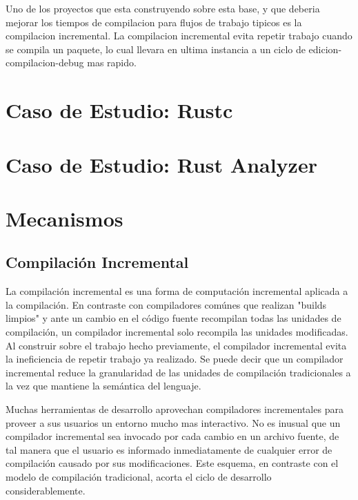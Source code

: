\documentclass[12pt, a4paper]{report}
\begin{document}
    Uno de los proyectos que esta construyendo sobre esta base, y que deberia mejorar los tiempos de compilacion para flujos de trabajo tipicos es la compilacion incremental.
    La compilacion incremental evita repetir trabajo cuando se compila un paquete, lo cual llevara en ultima instancia a un ciclo de edicion-compilacion-debug mas rapido.
    \cite{rust_blog_incremental_compilation}

\chapter*{Caso de Estudio: Rustc}

\chapter*{Caso de Estudio: Rust Analyzer}

\chapter*{Mecanismos}

  \section*{Compilación Incremental}

    La compilación incremental es una forma de computación incremental aplicada a la compilación.
    En contraste con compiladores comúnes que realizan "builds limpios" y ante un cambio en el código fuente recompilan todas las unidades de compilación, un compilador incremental solo recompila las unidades modificadas.
    Al construir sobre el trabajo hecho previamente, el compilador incremental evita la ineficiencia de repetir trabajo ya realizado.
    Se puede decir que un compilador incremental reduce la granularidad de las unidades de compilación tradicionales a la vez que mantiene la semántica del lenguaje.
    \cite{wiki_incremental_compiler}

    Muchas herramientas de desarrollo aprovechan compiladores incrementales para proveer a sus usuarios un entorno mucho mas interactivo.
    No es inusual que un compilador incremental sea invocado por cada cambio en un archivo fuente, de tal manera que el usuario es informado inmediatamente de cualquier error de compilación causado por sus modificaciones.
    Este esquema, en contraste con el modelo de compilación tradicional, acorta el ciclo de desarrollo considerablemente.
    \cite{wiki_incremental_compiler}
\end{document}
